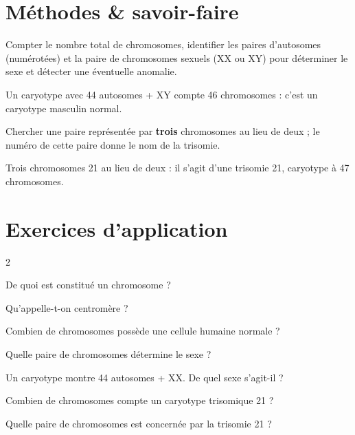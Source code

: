 \section{Méthodes \& savoir-faire}

Compter le nombre total de chromosomes, identifier les paires d'autosomes (numérotées)
et la paire de chromosomes sexuels (XX ou XY) pour déterminer le sexe et détecter une
éventuelle anomalie.
\begin{exemple}
Un caryotype avec 44 autosomes + XY compte 46 chromosomes : c'est un caryotype
masculin normal.
\end{exemple}

Chercher une paire représentée par \textbf{trois} chromosomes au lieu de deux ; le
numéro de cette paire donne le nom de la trisomie.
\begin{exemple}
Trois chromosomes 21 au lieu de deux : il s'agit d'une trisomie 21, caryotype à 47
chromosomes.
\end{exemple}

\section{Exercices d'application}
\begin{multicols}{2}

\exo{} De quoi est constitué un chromosome ?

\exo{} Qu'appelle-t-on centromère ?

\exo{} Combien de chromosomes possède une cellule humaine normale ?

\exo{} Quelle paire de chromosomes détermine le sexe ?

\exo{} Un caryotype montre 44 autosomes + XX. De quel sexe s'agit-il ?

\exo{} Combien de chromosomes compte un caryotype trisomique 21 ?

\exo{} Quelle paire de chromosomes est concernée par la trisomie 21 ?

\end{multicols}

